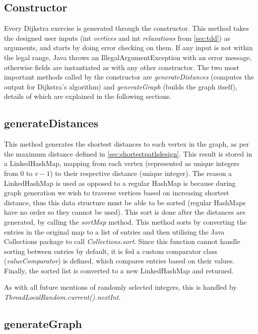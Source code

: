 \documentclass{l4proj}
\begin{document}
\subsection{Constructor}

Every Dijkstra exercise is generated through the constructor. This method takes the designed user inputs (int \emph{vertices} and int \emph{relaxations} from \autoref{sec:tdd}) as arguments, and  starts by doing error checking on them. If any input is not within the legal range, Java throws an IllegalArgumentException with an error message, otherwise fields are instantiated as with any other constructor. The two most important methods called by the constructor are \emph{generateDistances} (computes the output for Dijkstra's algorithm) and \emph{generateGraph} (builds the graph itself), details of which are explained in the following sections.

\subsection{generateDistances}

This method generates the shortest distances to each vertex in the graph, as per the maximum distance defined in \autoref{sec:shortestpathdesign}. This result is stored in a LinkedHashMap, mapping from each vertex (represented as unique integers from $0$ to $v-1$) to their respective distance (unique integer). The reason a LinkedHashMap is used as opposed to a regular HashMap is because during graph generation we wish to traverse vertices based on increasing shortest distance, thus this data structure must be able to be sorted (regular HashMaps have no order so they cannot be used). This sort is done after the distances are generated, by calling the \emph{sortMap} method. This method sorts by converting the entries in the original map to a list of entries and then utilising the Java Collections package to call \emph{Collections.sort}. Since this function cannot handle sorting between entries by default, it is fed a custom comparator class (\emph{valueComparator}) is defined, which compares entries based on their values. Finally, the sorted list is converted to a new LinkedHashMap and returned.

As with all future mentions of randomly selected integers, this is handled by \emph{ThreadLocalRandom.current().nextInt}.

\subsection{generateGraph}
\label{sec:generateGraph}
\end{document}
